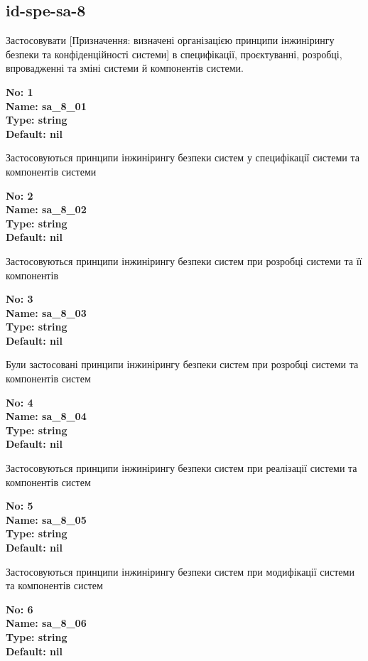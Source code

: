 \documentclass{article}
\begin{document}
\subsection{id-spe-sa-8}
Застосовувати [Призначення: визначені організацією принципи інжинірингу безпеки та конфіденційності системи] в специфікації, проєктуванні, розробці, впровадженні та зміні системи й компонентів системи.

\vspace{10pt}
{\footnotesize\bfseries
No: 1\\
Name: sa\_\allowbreak{}8\_\allowbreak{}01\\
Type: string\\
Default: nil
}

{\footnotesize Застосовуються принципи інжинірингу безпеки систем у специфікації системи та компонентів системи}


{\footnotesize\bfseries
No: 2\\
Name: sa\_\allowbreak{}8\_\allowbreak{}02\\
Type: string\\
Default: nil
}

{\footnotesize Застосовуються принципи інжинірингу безпеки систем при розробці системи та її компонентів}


{\footnotesize\bfseries
No: 3\\
Name: sa\_\allowbreak{}8\_\allowbreak{}03\\
Type: string\\
Default: nil
}

{\footnotesize Були застосовані принципи інжинірингу безпеки систем при розробці системи та компонентів систем}


{\footnotesize\bfseries
No: 4\\
Name: sa\_\allowbreak{}8\_\allowbreak{}04\\
Type: string\\
Default: nil
}

{\footnotesize Застосовуються принципи інжинірингу безпеки систем при реалізації системи та компонентів систем}


{\footnotesize\bfseries
No: 5\\
Name: sa\_\allowbreak{}8\_\allowbreak{}05\\
Type: string\\
Default: nil
}

{\footnotesize Застосовуються принципи інжинірингу безпеки систем при модифікації системи та компонентів систем}


{\footnotesize\bfseries
No: 6\\
Name: sa\_\allowbreak{}8\_\allowbreak{}06\\
Type: string\\
Default: nil
}
\end{document}
